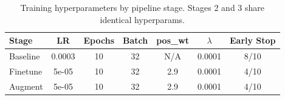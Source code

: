 \begin{table}[htbp]
\centering
\caption{Training hyperparameters by pipeline stage. Stages 2 and 3 share identical hyperparams.}
\label{tab:training_config}
\begin{tabular}{lcccccc}
\toprule
\textbf{Stage} & LR & Epochs & Batch & pos\_wt & $\lambda$ & Early Stop \\
\midrule
Baseline & 0.0003 & 10 & 32 & N/A & 0.0001 & 8/10 \\
Finetune & 5e-05 & 10 & 32 & 2.9 & 0.0001 & 4/10 \\
Augment & 5e-05 & 10 & 32 & 2.9 & 0.0001 & 4/10 \\
\bottomrule
\end{tabular}
\end{table}
